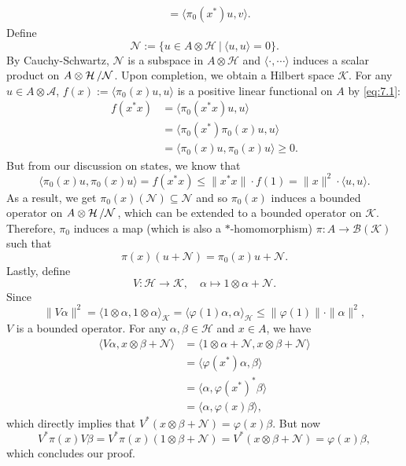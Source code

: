 \begin{myproof}
\begin{align}
        &= \langle \pi_0 (x^*) u, v \rangle. \label{eq:7.1}
    \end{align}
    Define $$\mathcal{N} := \{u \in A \otimes \mathcal{H}\ |\ \langle u, u \rangle = 0\}.$$
    By Cauchy-Schwartz, $\mathcal{N}$ is a subspace in $A \otimes \mathcal{H}$ and $\langle \cdot, \cdots \rangle$
    induces a scalar product on $\quot{A \otimes \mathcal{H}}{\mathcal{N}}$. Upon completion, we obtain a Hilbert space $\mathcal{K}$.
    For any $u \in A \otimes \mathcal{A}$, $f(x) := \langle \pi_0 (x) u, u \rangle$ is a positive linear functional on $A$ by \eqref{eq:7.1}:
    \begin{align*}
        f(x^* x) &= \langle \pi_0 (x^* x) u, u \rangle\\
        &= \langle \pi_0 (x^*) \pi_0 (x) u, u\rangle \\
        &= \langle \pi_0 (x) u, \pi_0 (x) u\rangle \geq 0.
    \end{align*}
    But from our discussion on states, we know that 
    $$\langle \pi_0 (x) u, \pi_0 (x) u\rangle = f(x^* x) \leq \| x^* x\| \cdot f(1) = \| x\|^2 \cdot \langle u, u \rangle.$$
    As a result, we get $\pi_0 (x) (\mathcal{N}) \subseteq \mathcal{N}$ and so $\pi_0 (x)$ induces a bounded operator on $\quot{A \otimes \mathcal{H}}{\mathcal{N}}$,
    which can be extended to a bounded operator on $\mathcal{K}$. Therefore, $\pi_0$ induces a map (which is also a $*$-homomorphism) $\pi: A \to \mathcal{B}(\mathcal{K})$ such that  
    $$\pi (x) (u + \mathcal{N}) = \pi_0 (x)u + \mathcal{N}.$$
    Lastly, define $$V: \mathcal{H} \to \mathcal{K},\quad \alpha \mapsto 1 \otimes \alpha + \mathcal{N}.$$
    Since $$\| V \alpha \|^2 = \langle 1 \otimes \alpha, 1 \otimes \alpha \rangle_{\mathcal{K}} = \langle \varphi (1) \alpha, \alpha \rangle_{\mathcal{H}} \leq \| \varphi (1)\| \cdot \| \alpha \|^2,$$
    $V$ is a bounded operator. For any $\alpha, \beta \in \mathcal{H}$ and $x \in A$, we have 
    \begin{align*}
        \langle V \alpha, x \otimes \beta + \mathcal{N} \rangle &= \langle 1 \otimes \alpha + \mathcal{N}, x \otimes \beta + \mathcal{N}\rangle\\
        &= \langle \varphi (x^*) \alpha, \beta \rangle\\
        &= \langle \alpha, \varphi (x^*)^* \beta \rangle\\
        &= \langle \alpha, \varphi(x) \beta \rangle,
    \end{align*}
    which directly implies that $V^* (x \otimes \beta + \mathcal{N}) = \varphi(x) \beta$. But now 
    $$V^* \pi(x) V \beta = V^* \pi (x) (1 \otimes \beta + \mathcal{N}) = V^* (x \otimes \beta + \mathcal{N}) = \varphi(x) \beta,$$
    which concludes our proof.
\end{myproof}

